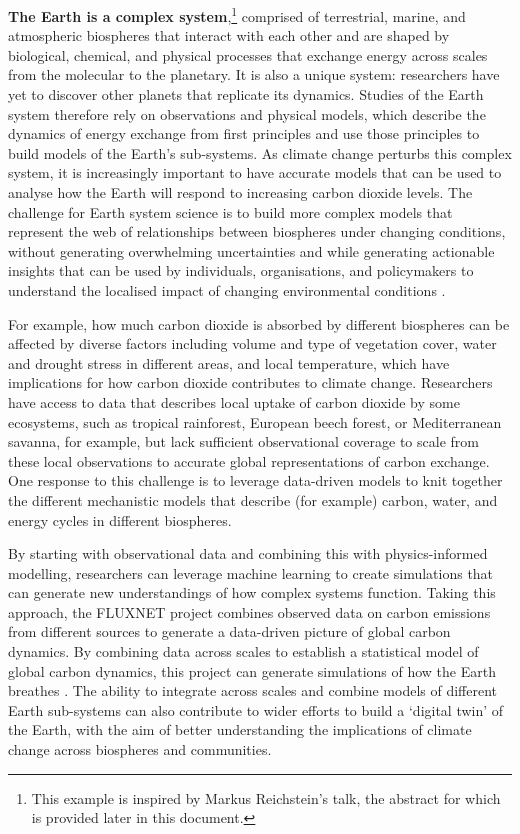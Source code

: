\noindent\textbf{The Earth is a complex system},\footnote{This example is
  inspired by Markus Reichstein's talk, the abstract for which is
  provided later in this document.} comprised of terrestrial, marine,
and atmospheric biospheres that interact with each other and are shaped
by biological, chemical, and physical processes that exchange energy
across scales from the molecular to the planetary. It is also a unique
system: researchers have yet to discover other planets that replicate
its dynamics. Studies of the Earth system therefore rely on observations
and physical models, which describe the dynamics of energy exchange from
first principles and use those principles to build models of the Earth's
sub-systems. As climate change perturbs this complex system, it is
increasingly important to have accurate models that can be used to
analyse how the Earth will respond to increasing carbon dioxide levels.
The challenge for Earth system science is to build more complex models
that represent the web of relationships between biospheres under
changing conditions, without generating overwhelming uncertainties and
while generating actionable insights that can be used by individuals,
organisations, and policymakers to understand the localised impact of
changing environmental conditions \cite{Summers-localized22}.

For example, how much carbon dioxide is absorbed by different biospheres
can be affected by diverse factors including volume and type of
vegetation cover, water and drought stress in different areas, and local
temperature, which have implications for how carbon dioxide contributes
to climate change. Researchers have access to data that describes local
uptake of carbon dioxide by some ecosystems, such as tropical
rainforest, European beech forest, or Mediterranean savanna, for
example, but lack sufficient observational coverage to scale from these
local observations to accurate global representations of carbon
exchange. One response to this challenge is to leverage data-driven
models to knit together the different mechanistic models that describe
(for example) carbon, water, and energy cycles in different biospheres.

By starting with observational data and combining this with
physics-informed modelling, researchers can leverage machine learning to
create simulations that can generate new understandings of how complex
systems function. Taking this approach, the FLUXNET project combines
observed data on carbon emissions from different sources to generate a
data-driven picture of global carbon dynamics. By combining data across
scales to establish a statistical model of global carbon dynamics, this
project can generate simulations of how the Earth breathes \cite{Beer-terrestrial10}. The ability to integrate across scales and
combine models of different Earth sub-systems can also contribute to
wider efforts to build a `digital twin' of the Earth, with the aim of
better understanding the implications of climate change across
biospheres and communities.

